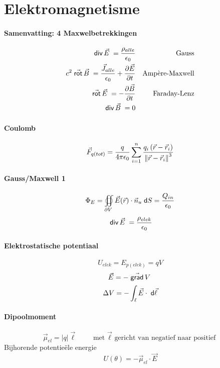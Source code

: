 \section{Elektromagnetisme}
\label{sec:EM}


\paragraph{Samenvatting: 4 Maxwelbetrekkingen}

  \begin{eqnarray*}
     \;\textsf{div}\,\vec{E}\; = \frac{\rho_{alle}}{\epsilon_0} &&
     \mbox{Gauss} \\
     c^2 \;\vec{\textsf{rot}}\,\vec{B}\; = \frac{\vec{J}_{alle}}{\epsilon_0} + \frac{\partial \vec{E}}{\partial t} &&
     \mbox{Ampère-Maxwell}\\
     \;\vec{\textsf{rot}}\,\vec{E}\; = - \frac{\partial \vec{B}}{\partial t} &&
     \mbox{Faraday-Lenz}\\
     \;\textsf{div}\,\vec{B}\; = 0 &&
  \end{eqnarray*} 




\paragraph{Coulomb}
\[
  \vec{F}_{q(tot)} = \frac{q}{4 \pi \epsilon_0} \sum_{i=1}^n \frac{q_i \left(\vec{r} - \vec{r}_i\right)}{\left\| \vec{r} - \vec{r}_i \right\|^3}
\]
\paragraph{Gauss/Maxwell 1}
\[
  \Phi_E = \oiint_{\partial V}\vec{E}(\vec{r})\cdot \vec{n}_u \;\textsf{d}S = \frac{Q_{in}}{\epsilon_0}
\]
\[
  \;\textsf{div}\,\vec{E}\; = \frac{\rho_{elek}}{\epsilon_0}
\]


\paragraph{Elektrostatische potentiaal}
\[
  U_{elek} = E_{p(elek)} = q V
\]
\[
  \vec{E} = -\;\vec{\textsf{grad}}\,V\;
\]
\[
  \Delta V = - \int_\ell \vec{E} \cdot \;\textsf{d}\vec{\ell}
\]


\paragraph{Dipoolmoment}
\[
  \vec{\mu}_{el} = |q| \vec{\ell} \qquad \mbox{met $\vec{\ell}$ gericht van negatief naar positief}
\]
Bijhorende potentieële energie
\[
  U(\theta) = - \vec{\mu}_{el} \cdot \vec{E}
\]


